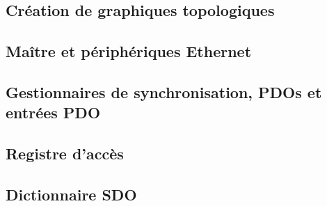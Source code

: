 \documentclass[a4paper,12pt,BCOR=6mm,bibtotoc,idxtotoc]{scrbook}
\begin{document}





\subsection{Cr\'eation de graphiques topologiques}




\subsection{Ma\^itre et p\'eriph\'eriques Ethernet}




\subsection{Gestionnaires de synchronisation, PDOs et entr\'ees PDO}




\subsection{Registre d'acc\`es}
\label{sec:regaccess}






\subsection{Dictionnaire SDO}
\end{document}
